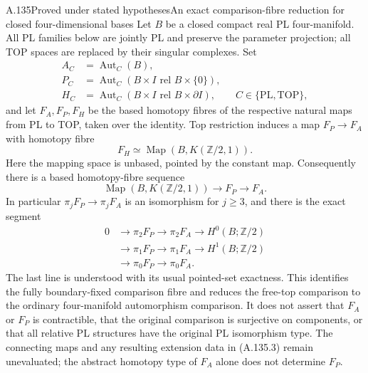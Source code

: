 \begin{saresult}{A.135}{Proved under stated hypotheses}{An exact comparison-fibre reduction for closed four-dimensional bases}
Let $B$ be a closed compact real PL four-manifold. All PL families below
are jointly PL and preserve the parameter projection; all TOP spaces
are replaced by their singular complexes. Set
\[
\begin{aligned}
 A_C&=\operatorname{Aut}_C(B),\\
 P_C&=\operatorname{Aut}_C(B\times I\text{ rel }B\times\{0\}),\\
 H_C&=\operatorname{Aut}_C(B\times I\text{ rel }B\times\partial I),
 \qquad C\in\{\mathrm{PL},\mathrm{TOP}\},
\end{aligned}
\]
and let $F_A,F_P,F_H$ be the based homotopy fibres of the respective
natural maps from PL to TOP, taken over the identity.
Top restriction induces a map $F_P\to F_A$ with homotopy fibre
\[
 F_H\simeq \operatorname{Map}(B,K(\mathbb Z/2,1)).
                                                        \tag{A.135.1}
\]
Here the mapping space is unbased, pointed by the constant map.
Consequently there is a based homotopy-fibre sequence
\[
 \operatorname{Map}(B,K(\mathbb Z/2,1))
 \longrightarrow F_P\longrightarrow F_A.                \tag{A.135.2}
\]
In particular $\pi_jF_P\to\pi_jF_A$ is an isomorphism for $j\ge3$,
and there is the exact segment
\[
\begin{aligned}
0&\longrightarrow\pi_2F_P\longrightarrow\pi_2F_A
\longrightarrow H^0(B;\mathbb Z/2)\\
 &\longrightarrow\pi_1F_P\longrightarrow\pi_1F_A
\longrightarrow H^1(B;\mathbb Z/2)\\
 &\longrightarrow\pi_0F_P\longrightarrow\pi_0F_A.
\end{aligned}                                           \tag{A.135.3}
\]
The last line is understood with its usual pointed-set exactness.
This identifies the fully boundary-fixed comparison fibre and reduces
the free-top comparison to the ordinary four-manifold automorphism
comparison. It does not assert that $F_A$ or $F_P$ is contractible,
that the original comparison is surjective on components, or that
all relative PL structures have the original PL isomorphism type.
The connecting maps and any resulting extension data in (A.135.3)
remain unevaluated; the abstract homotopy type of $F_A$ alone does
not determine $F_P$.
\end{saresult}
